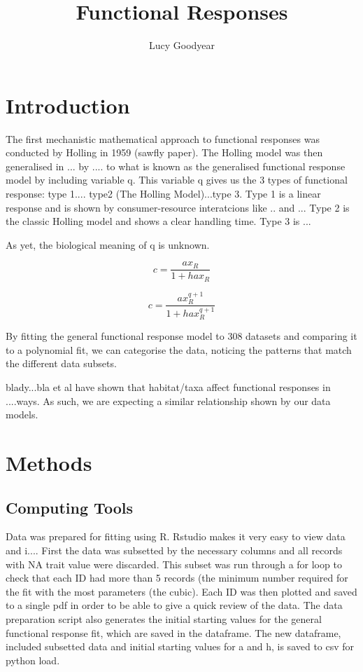 \documentclass[11pt, a4paper, titlepage]{article}
\title{Functional Responses}
\author{Lucy Goodyear}
\date{}
\begin{document}
	\maketitle

\section{Introduction}

The first mechanistic mathematical approach to functional responses was conducted by Holling in 1959 (sawfly paper). The Holling model was then generalised in ... 
by .... to what is known as the generalised functional response model by including variable q. This variable q gives us the 3 types of functional response: 
type 1.... type2 (The Holling Model)...type 3. Type 1 is a linear response and is shown by consumer-resource interatcions like .. and ... 
Type 2 is the classic Holling model and shows a clear handling time. Type 3 is ...

As yet, the biological meaning of q is unknown.

\begin{equation}
    c = \frac{ax_R}{1 + hax_R}
\end{equation}

\begin{equation}
    c = \frac{ax_R^{q + 1}}{1 + hax_R^{q + 1}}
\end{equation}

By fitting the general functional response model to 308 datasets and comparing it to a polynomial fit, we can categorise the data, noticing the patterns
that match the different data subsets. 

blady...bla et al have shown that habitat/taxa affect functional responses in ....ways. As such, we are expecting a similar relationship shown by 
our data models.

\section{Methods}

\subsection{Computing Tools}

Data was prepared for fitting using R. Rstudio makes it very easy to view data and i.... First the data was subsetted by the necessary columns and all records with NA trait value were discarded. This subset was run through a for loop to check that each ID had more than 5 records (the minimum number required for the fit with the most parameters (the cubic). Each ID was then plotted and saved to a single pdf in order to be able to give a quick review of the data. The data preparation script also generates the initial starting values for the general functional response fit, which are saved in the dataframe. The new dataframe, included subsetted data and initial starting values for a and h, is saved to csv for python load.
\end{document}

